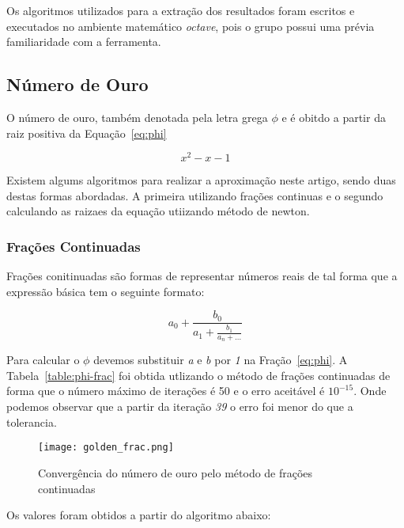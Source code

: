 	Os algoritmos utilizados para a extração dos resultados foram escritos e
	executados no ambiente matemático \emph{octave}, pois o grupo possui uma
	prévia familiaridade com a ferramenta. 
	
	\subsection{Número de Ouro}
		
		O número de ouro, também denotada pela letra grega $\phi$ e é obitdo a
		partir da raiz positiva da Equação~\ref{eq:phi}

		\begin{equation}
			x^2-x-1
		\label{eq:phi}
		\end{equation}

		Existem algums algoritmos para realizar a aproximação neste artigo,
		sendo duas destas formas  abordadas. A primeira utilizando frações
		continuas e o segundo calculando as raizaes da equação utiizando método
		de newton.

		\subsubsection{Frações Continuadas}

			Frações conitinuadas são formas de representar números reais de tal
			forma que a expressão básica tem o seguinte formato:

			\begin{equation}
			\label{eq:phi-frac}
				a_0 + \frac{b_0}{a_1 + \frac{b_1}{a_n + \dots}}
			\end{equation}

			Para calcular o $\phi$ devemos substituir \emph{a} e \emph{b} por
			\emph{1} na Fração~\ref{eq:phi}. A Tabela~\ref{table:phi-frac} foi
			obtida utlizando o método de frações continuadas de forma que o
			número máximo de iterações é 50 e o erro aceitável é $10^{-15}$. Onde
			podemos observar que a partir da iteração \emph{39} o erro foi
			menor do que a tolerancia.

			


			\begin{figure}[H]
				\centering
				\texttt{[image: golden\_frac.png]}
				\caption{Convergência do número de ouro pelo método de frações continuadas}
				\label{golden_frac}
			\end{figure}


			Os valores foram obtidos a partir do algoritmo abaixo:

